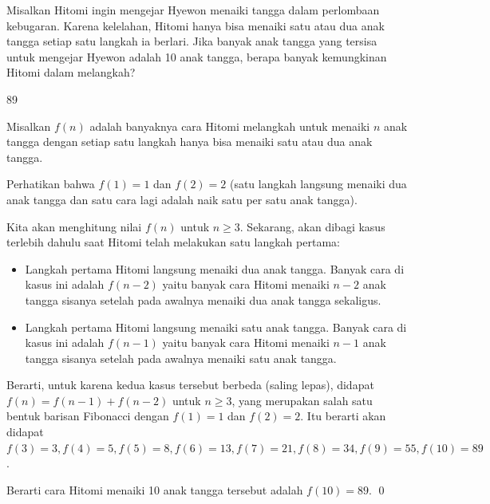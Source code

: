 \documentclass[12pt]{scrartcl}
\begin{document}
	\begin{soalbaru}
		Misalkan Hitomi ingin mengejar Hyewon menaiki tangga dalam perlombaan kebugaran. Karena kelelahan, Hitomi hanya bisa menaiki satu atau dua anak tangga setiap satu langkah ia berlari. Jika banyak anak tangga yang tersisa untuk mengejar Hyewon adalah 10 anak tangga, berapa banyak kemungkinan Hitomi dalam melangkah?
		
		\begin{jawaban}
		89
		\end{jawaban}
		\begin{solusi}
		Misalkan $f(n)$ adalah banyaknya cara Hitomi melangkah untuk menaiki $n$ anak tangga dengan setiap satu langkah hanya bisa menaiki satu atau dua anak tangga.
		
		Perhatikan bahwa $f(1)=1$ dan $f(2)=2$ (satu langkah langsung menaiki dua anak tangga dan satu cara lagi adalah naik satu per satu anak tangga).
		
		Kita akan menghitung nilai $f(n)$ untuk $n \ge 3$. Sekarang, akan dibagi kasus terlebih dahulu saat Hitomi telah melakukan satu langkah pertama:
		\begin{itemize}
		\item Langkah pertama Hitomi langsung menaiki dua anak tangga. Banyak cara di kasus ini adalah $f(n-2)$ yaitu banyak cara Hitomi menaiki $n-2$ anak tangga sisanya setelah pada awalnya menaiki dua anak tangga sekaligus.
		
		\item Langkah pertama Hitomi langsung menaiki satu anak tangga. Banyak cara di kasus ini adalah $f(n-1)$ yaitu banyak cara Hitomi menaiki $n-1$ anak tangga sisanya setelah pada awalnya menaiki satu anak tangga.
		\end{itemize}
		
		Berarti, untuk karena kedua kasus tersebut berbeda (saling lepas), didapat $f(n)=f(n-1)+f(n-2)$ untuk $n \ge 3$, yang merupakan salah satu bentuk barisan Fibonacci dengan $f(1)=1$ dan $f(2)=2$. Itu berarti akan didapat $f(3)=3,f(4)=5,f(5)=8,f(6)=13,f(7)=21,f(8)=34,f(9)=55,f(10)=89$.
		
		Berarti cara Hitomi menaiki 10 anak tangga tersebut adalah $f(10)=89$. \qed
		\end{solusi}
	\end{soalbaru}
	
\end{document}
